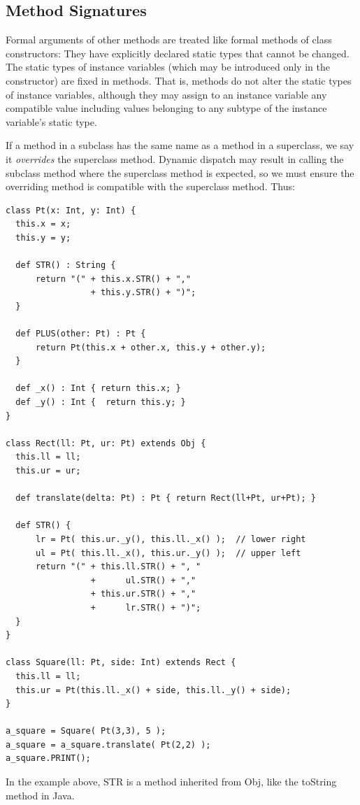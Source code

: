 \documentclass[11pt]{article}
\begin{document}
\subsection{Method Signatures}

Formal arguments of other methods are treated like formal methods of
class constructors:  They have explicitly declared static types that
cannot be changed.  The static types of instance variables (which may
be introduced only in the constructor) are fixed in methods.  That is,
methods do not alter the static types of instance variables, although
they may assign to an instance variable any compatible value including
values belonging to any subtype of the instance variable's static
type. 

If a method in a subclass has the same name as a method in a
superclass, we say it \emph{overrides} the superclass method.  Dynamic
dispatch may result in calling the subclass method where the
superclass method is expected, so we must ensure the overriding method
is compatible with the superclass method.   Thus: 

\begin{verbatim}
class Pt(x: Int, y: Int) {
  this.x = x;
  this.y = y;

  def STR() : String {
      return "(" + this.x.STR() + "," 
                 + this.y.STR() + ")";
  }

  def PLUS(other: Pt) : Pt {
      return Pt(this.x + other.x, this.y + other.y);
  }

  def _x() : Int { return this.x; }
  def _y() : Int {  return this.y; }
}

class Rect(ll: Pt, ur: Pt) extends Obj {
  this.ll = ll;
  this.ur = ur;

  def translate(delta: Pt) : Pt { return Rect(ll+Pt, ur+Pt); }

  def STR() {
      lr = Pt( this.ur._y(), this.ll._x() );  // lower right 
      ul = Pt( this.ll._x(), this.ur._y() );  // upper left
      return "(" + this.ll.STR() + ", "
                 +      ul.STR() + "," 
                 + this.ur.STR() + ","
                 +      lr.STR() + ")";
  }
}

class Square(ll: Pt, side: Int) extends Rect {
  this.ll = ll;
  this.ur = Pt(this.ll._x() + side, this.ll._y() + side);
}
  
a_square = Square( Pt(3,3), 5 );
a_square = a_square.translate( Pt(2,2) );
a_square.PRINT();
\end{verbatim}

In the example above, STR is a method inherited from Obj, like the
toString  method in Java.  
\end{document}
